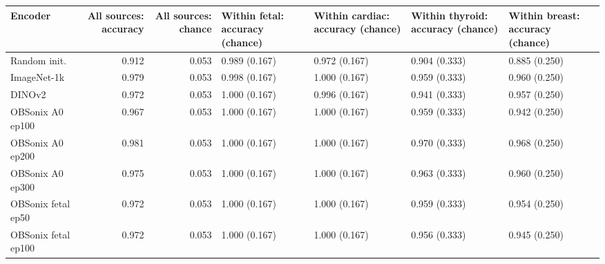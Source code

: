 \begin{tabular}{lrrllll}
\toprule
Encoder & All sources: accuracy & All sources: chance & Within fetal: accuracy (chance) & Within cardiac: accuracy (chance) & Within thyroid: accuracy (chance) & Within breast: accuracy (chance) \\
\midrule
Random init. & 0.912 & 0.053 & 0.989 (0.167) & 0.972 (0.167) & 0.904 (0.333) & 0.885 (0.250) \\
ImageNet-1k & 0.979 & 0.053 & 0.998 (0.167) & 1.000 (0.167) & 0.959 (0.333) & 0.960 (0.250) \\
DINOv2 & 0.972 & 0.053 & 1.000 (0.167) & 0.996 (0.167) & 0.941 (0.333) & 0.957 (0.250) \\
OBSonix A0 ep100 & 0.967 & 0.053 & 1.000 (0.167) & 1.000 (0.167) & 0.959 (0.333) & 0.942 (0.250) \\
OBSonix A0 ep200 & 0.981 & 0.053 & 1.000 (0.167) & 1.000 (0.167) & 0.970 (0.333) & 0.968 (0.250) \\
OBSonix A0 ep300 & 0.975 & 0.053 & 1.000 (0.167) & 1.000 (0.167) & 0.963 (0.333) & 0.960 (0.250) \\
OBSonix fetal ep50 & 0.972 & 0.053 & 1.000 (0.167) & 1.000 (0.167) & 0.959 (0.333) & 0.954 (0.250) \\
OBSonix fetal ep100 & 0.972 & 0.053 & 1.000 (0.167) & 1.000 (0.167) & 0.956 (0.333) & 0.945 (0.250) \\
\bottomrule
\end{tabular}
